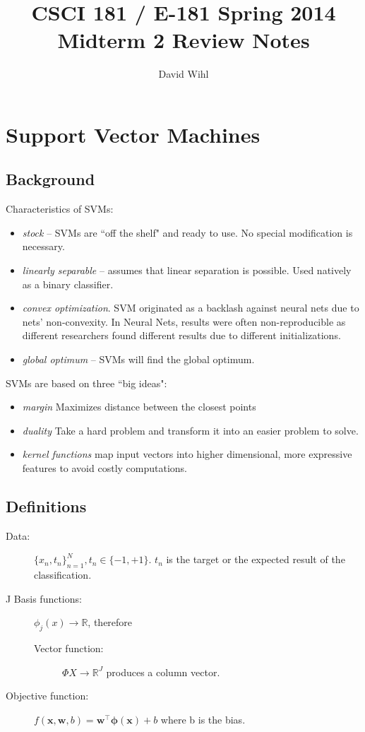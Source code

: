 \documentclass[11pt, oneside]{article}   	%
\title{CSCI 181 / E-181 Spring 2014 \\ 
{\large Midterm 2 Review Notes}
}
\author{
  David Wihl\\
}
\begin{document}
\maketitle

\begingroup
\hypersetup{linkcolor=blue}
\tableofcontents
\endgroup

\section{Support Vector Machines}

\subsection{Background}
Characteristics of SVMs:
\begin{itemize}
	\item \emph{stock} -- SVMs are ``off the shelf" and ready to use. No special modification is necessary.
	\item \emph{linearly separable} -- assumes that linear separation is possible. Used natively as a binary classifier.
	\item \emph{convex optimization}. SVM originated as a backlash against neural nets due to nets' non-convexity. In Neural Nets, results were often non-reproducible as different researchers found different results due to different initializations.
	\item \emph{global optimum} -- SVMs will find the global optimum.
\end{itemize}

SVMs are based on three ``big ideas":
\begin{itemize}
	\item \emph{margin} Maximizes distance between the closest points
	\item \emph{duality} Take a hard problem and transform it into an easier problem to solve.
	\item \emph{kernel functions} map input vectors into higher dimensional, more expressive features to avoid costly computations.
\end{itemize}

\subsection{Definitions}

\begin{description}
	\item[Data:] $\{x_n,t_n\}_{n=1}^N, t_n \in \{-1, +1\}$. $t_n$ is the target or the expected result of the classification.
	\item[J Basis functions:] $\phi_j(x)\rightarrow\mathbb{R}$, therefore
	\begin{description}
		\item[Vector function:] $\Phi X \rightarrow \mathbb{R}^J$ produces a column vector.
	\end{description}
	\item[Objective function:]
$f(\textbf{x},\textbf{w},b) = \textbf{w}^\intercal \mathbf{\phi}(\textbf{x})  + b$
where b is the bias.
\end{description}
\end{document}
